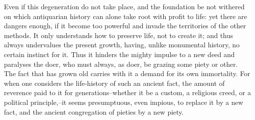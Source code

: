 Even if this degeneration do not take place, and the foundation be
not withered on which antiquarian history can alone take root with
profit to life: yet there are dangers enough, if it become too
powerful and invade the territories of the other methods. It only
understands how to preserve life, not to create it; and thus always
undervalues the present growth, having, unlike monumental history, no
certain instinct for it. Thus it hinders the mighty impulse to a new
deed and paralyses the doer, who must always, as doer, be grazing
some piety or other. The fact that has grown old carries with it a
demand for its own immortality. For when one considers the
life-history of such an ancient fact, the amount of reverence paid to
it for generations--whether it be a custom, a religious creed, or a
political principle,--it seems presumptuous, even impious, to replace
it by a new fact, and the ancient congregation of pieties by a new
piety.

